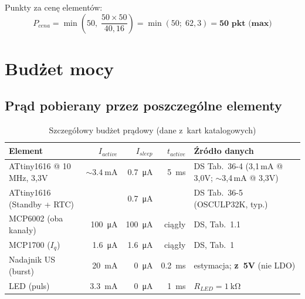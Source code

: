 \documentclass[a4paper,11pt]{article}
\begin{document}
Punkty za cenę elementów:
\begin{equation}
    P_{cena} = \min\!\left(50,\; \frac{50 \times 50}{40{,}16}\right)
    = \min(50;\; 62{,}3) = \textbf{50~pkt~(max)}
    \label{eq:pkt_cena}
\end{equation}


\section{Budżet mocy}
\label{sec:moc}

\subsection{Prąd pobierany przez poszczególne elementy}

\begin{table}[H]
    \centering
    \caption{Szczegółowy budżet prądowy (dane z~kart katalogowych)}
    \label{tab:moc_detail}
    \begin{tabularx}{\textwidth}{l r r r X}
        \toprule
        \textbf{Element} & \textbf{$I_{active}$} & \textbf{$I_{sleep}$}
            & \textbf{$t_{active}$} & \textbf{Źródło danych} \\
        \midrule
        ATtiny1616 @ 10\,MHz, 3{,}3V
            & ${\sim}\SI{3,4}{\milli\ampere}$
            & \SI{0,7}{\micro\ampere}
            & \SI{5}{\milli\second}
            & DS Tab.~36-4 (3{,}1\,mA @ 3{,}0V; ${\sim}$3{,}4\,mA @ 3{,}3V) \\
        ATtiny1616 (Standby + RTC)
            &
            & \SI{0,7}{\micro\ampere}
            &
            & DS Tab.~36-5 (OSCULP32K, typ.) \\
        MCP6002 (oba kanały)
            & \SI{100}{\micro\ampere}
            & \SI{100}{\micro\ampere}
            & ciągły
            & DS, Tab.~1.1 \\
        MCP1700 ($I_q$)
            & \SI{1,6}{\micro\ampere}
            & \SI{1,6}{\micro\ampere}
            & ciągły
            & DS, Tab.~1 \\
        Nadajnik US (burst)
            & \SI{20}{\milli\ampere}
            & \SI{0}{\micro\ampere}
            & \SI{0,2}{\milli\second}
            & estymacja; \textbf{z~5V} (nie LDO) \\
        LED (puls)
            & \SI{3,3}{\milli\ampere}
            & \SI{0}{\micro\ampere}
            & \SI{1}{\milli\second}
            & $R_{LED} = \SI{1}{\kilo\ohm}$ \\
        \bottomrule
    \end{tabularx}
\end{table}
\end{document}

